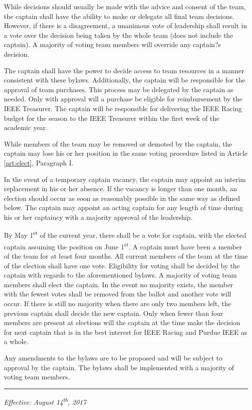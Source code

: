 \documentclass[12pt]{constitution}
\newcommand{\datetermstart}{June 1\textsuperscript{st}} %
\newcommand{\dateelectionsheld}{May 1\textsuperscript{st}} %
\begin{document}
\label{art:decide}

While decisions should usually be made with the advice and consent of the team, the captain shall have the ability to make or delegate all final team decisions. However, if there is a disagreement, a unanimous vote of leadership shall result in a vote over the decision being taken by the whole team (does not include the captain). A majority of voting team members will override any captain?s decision.

The captain shall have the power to decide access to team resources in a manner consistent with these bylaws. Additionally, the captain will be responsible for the approval of team purchases. This process may be delegated by the captain as needed. Only with approval will a purchase be eligible for reimbursement by the IEEE Treasurer. The captain will be responsible for delivering the IEEE Racing budget for the season to the IEEE Treasurer within the first week of the academic year.

While members of the team may be removed or demoted by the captain, the captain may lose his or her position in the same voting procedure listed in Article \ref{art:elect}, Paragraph I.

In the event of a temporary captain vacancy, the captain may appoint an interim replacement in his or her absence. If the vacancy is longer than one month, an election should occur as soon as reasonably possible in the same way as defined below. The captain may appoint an acting captain for any length of time during his or her captaincy with a majority approval of the leadership.

\label{art:elect}

By \dateelectionsheld{} of the current year, there shall be a vote for captain, with the elected captain assuming the position on \datetermstart{}. A captain must have been a member of the team for at least four months. All current members of the team at the time of the election shall have one vote. Eligibility for voting shall be decided by the captain with regards to the aforementioned bylaws. A majority of voting team members shall elect the captain. In the event no majority exists, the member with the fewest votes shall be removed from the ballot and another vote will occur. If there is still no majority when there are only two members left, the previous captain shall decide the new captain. Only when fewer than four members are present at elections will the captain at the time make the decision for next captain that is in the best interest for IEEE Racing and Purdue IEEE as a whole.


\label{art:bylaw}

Any amendments to the bylaws are to be proposed and will be subject to approval by the captain. The bylaws shall be implemented with a majority of voting team members.

\vspace{12pt}
\hrule

\textit{Effective: August 14\textsuperscript{th}, 2017}


\setcounter{tocdepth}{1}
\end{document}
